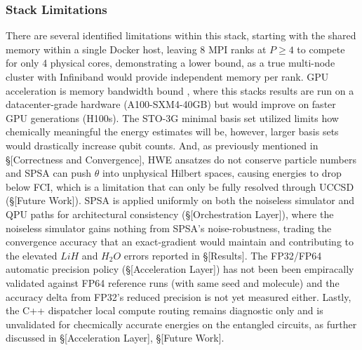 \subsubsection{Stack Limitations}
There are several identified limitations within this stack, starting with the shared memory within a single Docker host, leaving 8 MPI ranks at $P \geq 4$
to compete for only 4 physical cores, demonstrating a lower bound, as a true multi-node cluster with Infiniband would provide independent memory per rank. 
GPU acceleration is memory bandwidth bound \parencite{bayraktar2023cuquantum}, where this stacks results are run on a datacenter-grade hardware (A100-SXM4-40GB) but 
would improve on faster GPU generations (H100s). 
The STO-3G minimal basis set utilized limits how chemically meaningful the energy estimates will be, however, larger basis sets would drastically increase qubit counts. 
And, as previously mentioned in \S[Correctness and Convergence], HWE ansatzes do not conserve particle numbers and SPSA can push $\theta$ into unphysical Hilbert spaces, causing energies to drop
below FCI, which is a limitation that can only be fully resolved through UCCSD (\S[Future Work]). SPSA is applied uniformly on both the noiseless simulator and QPU paths for architectural consistency (\S[Orchestration Layer]), 
where the noiseless simulator gains nothing from SPSA's noise-robustness, trading the convergence accuracy that an exact-gradient would maintain and contributing to the elevated $LiH$ and $H_{2}O$ errors reported in \S[Results]. 
The FP32/FP64 automatic precision policy (\S[Acceleration Layer]) has not been been empiracally validated against FP64 reference runs (with same seed and molecule) and the accuracy delta 
from FP32's reduced precision is not yet measured either. 
Lastly, the C++ dispatcher local compute routing remains diagnostic only and is unvalidated for checmically accurate energies on the entangled circuits, as further discussed in \S[Acceleration Layer], \S[Future Work]. 


